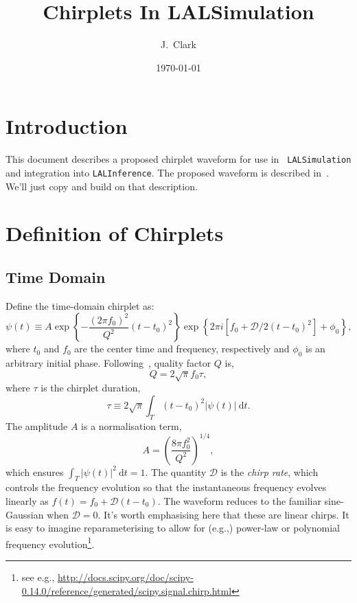 \documentclass[11pt]{ligovirgodcc}
\begin{document}
\pagestyle{fancy}
\rhead[]{}
\lhead[]{}
%
\title{Chirplets In LALSimulation}

\ligodocdraft{\hfill}

\author{J.~Clark}
%
\date{\today}

%
\maketitle

\tableofcontents
\newpage
\lstset{language=Python}
\section{Introduction}
This document describes a proposed chirplet waveform for use in {\tt
LALSimulation} and integration into {\tt LALInference}.  The proposed waveform
is described in~\cite{2010CQGra..27s4017C}.  We'll just copy and build on that
description.

\section{Definition of Chirplets}
\subsection{Time Domain}
Define the time-domain chirplet as:
\begin{equation}
\psi(t) \equiv A \exp\left\{-\frac{(2\pi
f_0)^2}{Q^2}(t-t_0)^2\right\} \exp \left\{ 2\pi i [ f_0 +
\mathcal{D}/2(t-t_0)^2 ] + \phi_0 \right\},
\end{equation}
%
where $t_0$ and $f_0$ are the center time and frequency, respectively and
$\phi_0$ is an arbitrary initial phase.  Following~\cite{2010CQGra..27s4017C},
quality factor $Q$ is,
\begin{equation}
Q = 2\sqrt{\pi} f_0 \tau,
\end{equation}
%
where $\tau$ is the chirplet duration,
\begin{equation}
\tau \equiv 2\sqrt{\pi} \int_T (t-t_0)^2 |\psi(t)|~\mathrm{d}t.
\end{equation}
%
The amplitude $A$ is a normalisation term,
\begin{equation}
A = \left(\frac{8\pi f_0^2}{Q^2}\right)^{1/4},
\end{equation}
%
which ensures $\int_T |\psi(t)|^2~\mathrm{d} t = 1$.  The quantity $\mathcal{D}$
is the \emph{chirp rate}, which controls the frequency evolution so that the
instantaneous frequency evolves linearly as $f(t) = f_0 + \mathcal{D}(t-t_0)$.
The waveform reduces to the familiar sine-Gaussian when $\mathcal{D}=0$.  It's
worth emphasising here that these are linear chirps.  It is easy to imagine
reparameterising to allow for (e.g.,) power-law or polynomial frequency
evolution\footnote{see e.g.,
\url{http://docs.scipy.org/doc/scipy-0.14.0/reference/generated/scipy.signal.chirp.html}}.
\end{document}
